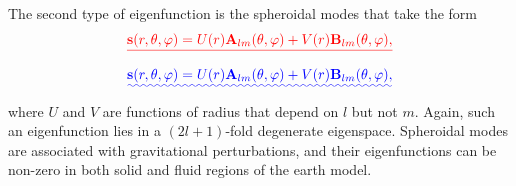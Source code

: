 \documentclass[a4paper,12pt]{paper}
\providecommand{\DIFadd}[1]{{\protect\color{blue}\uwave{#1}}} %
\providecommand{\DIFdel}[1]{{\protect\color{red}\sout{#1}}}                      %
\providecommand{\DIFaddbegin}{} %
\providecommand{\DIFaddend}{} %
\providecommand{\DIFdelbegin}{} %
\providecommand{\DIFdelend}{} %
\begin{document}
The second type of eigenfunction is the spheroidal modes that take the form
\DIFdelbegin \begin{displaymath}
\DIFdel{\mathbf{s}(r,\theta,\varphi)=U(r)\mathbf{A}_{lm}(\theta,\varphi)+V(r)\mathbf{B}_{lm}(\theta,\varphi),
}\end{displaymath}%
\DIFdelend \DIFaddbegin \begin{equation}\DIFadd{\label{eq:14}
\mathbf{s}(r,\theta,\varphi)=U(r)\mathbf{A}_{lm}(\theta,\varphi)+V(r)\mathbf{B}_{lm}(\theta,\varphi),
}\end{equation}\DIFaddend 
where $U$ and $V$ are functions of radius that depend on $l$ but not $m$.
Again, such an eigenfunction lies in a $(2l+1)$-fold degenerate eigenspace. Spheroidal modes 
are associated with gravitational perturbations, and their eigenfunctions can be non-zero in 
both solid and fluid regions of the earth model.
\end{document}

